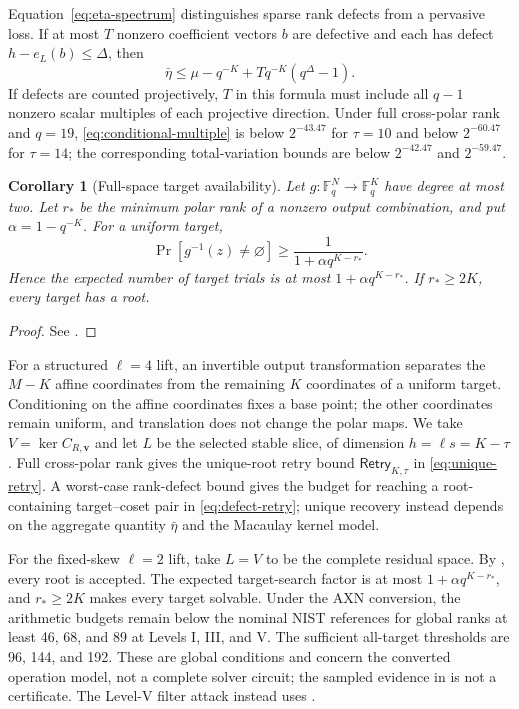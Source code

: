 \documentclass[11pt]{article}
\newtheorem{corollary}[corollary]{Corollary}
\newcommand{\F}{\mathbb F}
\begin{document}
Equation~\eqref{eq:eta-spectrum} distinguishes sparse rank defects from a
pervasive loss.  If at most $T$ nonzero coefficient vectors $b$ are defective
and each has defect $h-e_L(b)\le\Delta$, then
\begin{equation}\label{eq:defect-spectrum}
 \bar\eta\le
 \mu-q^{-K}+Tq^{-K}(q^\Delta-1).
\end{equation}
If defects are counted projectively, $T$ in this formula must include all
$q-1$ nonzero scalar multiples of each projective direction.  Under full
cross-polar rank and $q=19$, \eqref{eq:conditional-multiple} is below
$2^{-43.47}$ for $\tau=10$ and below $2^{-60.47}$ for $\tau=14$; the
corresponding total-variation bounds are below $2^{-42.47}$ and $2^{-59.47}$.

\begin{corollary}[Full-space target availability]\label{cor:full-space}
Let $g:\F_q^N\to\F_q^K$ have degree at most two.  Let $r_*$ be the
minimum polar rank of a nonzero output combination, and put
$\alpha=1-q^{-K}$.  For a uniform target,
\begin{equation}\label{eq:full-space-success}
 \Pr[g^{-1}(z)\ne\varnothing]
 \ge \frac{1}{1+\alpha q^{K-r_*}}.
\end{equation}
Hence the expected number of target trials is at most
$1+\alpha q^{K-r_*}$.  If $r_*\ge2K$, every target has a root.
\end{corollary}

\begin{proof}
See .
\end{proof}

For a structured $\ell=4$ lift, an invertible output transformation separates
the $M-K$ affine coordinates from the remaining $K$ coordinates of a uniform
target.  Conditioning on the affine coordinates fixes a base point; the other
coordinates remain uniform, and translation does not change the polar maps.
We take $V=\ker C_{R,\mathbf v}$ and let $L$ be the selected stable slice, of dimension
$h=\ell s=K-\tau$.  Full cross-polar rank gives the unique-root retry bound
$\mathsf{Retry}_{K,\tau}$ in \eqref{eq:unique-retry}.  A worst-case
rank-defect bound gives the budget for reaching a root-containing target--coset
pair in \eqref{eq:defect-retry}; unique recovery instead
depends on the aggregate quantity $\bar\eta$ and the Macaulay kernel model.

For the fixed-skew $\ell=2$ lift, take $L=V$ to be the complete residual space.
By , every root is accepted.  The expected target-search
factor is at most $1+\alpha q^{K-r_*}$, and $r_*\ge2K$ makes every target
solvable.  Under the AXN conversion, the arithmetic budgets remain below the
nominal NIST references for global ranks at least 46, 68, and 89 at Levels I,
III, and V.  The sufficient all-target thresholds are 96, 144, and 192.  These
are global conditions and concern the converted operation model, not a
complete solver circuit; the sampled evidence in  is not a
certificate.  The Level-V filter attack instead uses
.
\end{document}
